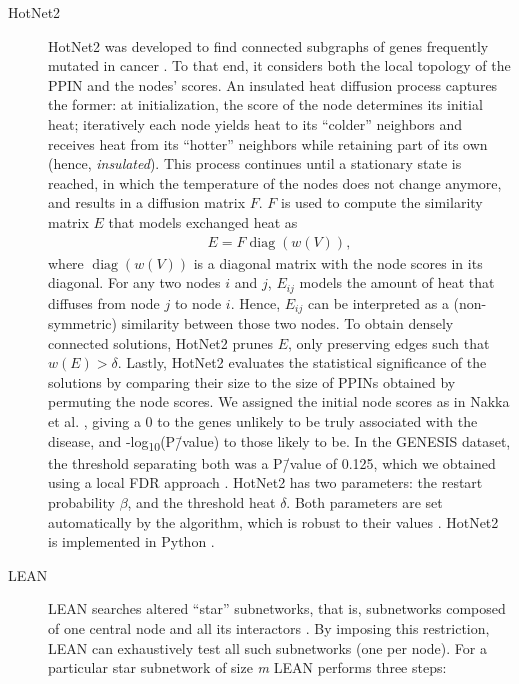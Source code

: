 \documentclass[10pt,letterpaper]{article}
\begin{document}
\begin{description}
\item[{HotNet2}] HotNet2 was developed to find connected subgraphs of genes frequently mutated in cancer \cite{leiserson_pan-cancer_2015}. To that end, it considers both the local topology of the PPIN and the nodes' scores. An insulated heat diffusion process captures the former: at initialization, the score of the node determines its initial heat; iteratively each node yields heat to its ``colder'' neighbors and receives heat from its ``hotter'' neighbors while retaining part of its own (hence, \emph{insulated}). This process continues until a stationary state is reached, in which the temperature of the nodes does not change anymore, and results in a diffusion matrix $F$. $F$ is used to compute the similarity matrix $E$ that models exchanged heat as
\begin{eqnarray} 
E = F \operatorname{diag}(w(V)), 
\end{eqnarray}
where $\operatorname{diag}(w(V))$ is a diagonal matrix with the node scores in its diagonal. For any two nodes $i$ and $j$, $E_{ij}$ models the amount of heat that diffuses from node $j$ to node $i$. Hence, $E_{ij}$ can be interpreted as a (non-symmetric) similarity between those two nodes. To obtain densely connected solutions, HotNet2 prunes $E$, only preserving edges such that $w(E) > \delta$. Lastly, HotNet2 evaluates the statistical significance of the solutions by comparing their size to the size of PPINs obtained by permuting the node scores. We assigned the initial node scores as in Nakka et al. \cite{nakka_gene_2016}, giving a 0 to the genes unlikely to be truly associated with the disease, and -log\textsubscript{10}(P\=/value) to those likely to be. In the GENESIS dataset, the threshold separating both was a P\=/value of 0.125, which we obtained using a local FDR approach \cite{scheid_twilight;_2005}. HotNet2 has two parameters: the restart probability \(\beta\), and the threshold heat \(\delta\). Both parameters are set automatically by the algorithm, which is robust to their values \cite{leiserson_pan-cancer_2015}. HotNet2 is implemented in Python \cite{hotnet2}.

\item[{LEAN}] LEAN searches altered ``star'' subnetworks, that is, subnetworks composed of one central node and all its interactors \cite{gwinner_network-based_2016}. By imposing this restriction, LEAN can exhaustively test all such subnetworks (one per node). For a particular star subnetwork of size \emph{m} LEAN performs three steps:


\end{description}
\end{document}
